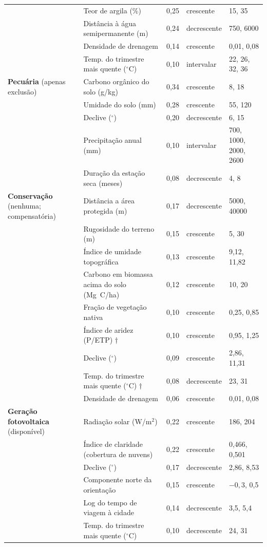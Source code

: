 \begin{longtable}{@{}p{2.6cm}p{3.6cm}p{1cm}p{1.7cm}p{3.3cm}@{}}
 & Teor de argila (\%) & 0,25 & crescente & 15, 35 \\
 & Distância à água semipermanente (m) & 0,24 & decrescente & 750, 6000 \\
 & Densidade de drenagem & 0,14 & crescente & 0,01, 0,08 \\
 & Temp. do trimestre mais quente ($^\circ$C) & 0,10 & intervalar & 22, 26, 32, 36 \\
\textbf{Pecuária} (apenas exclusão) & Carbono orgânico do solo (g/kg) & 0,34 & crescente & 8, 18 \\
 & Umidade do solo (mm) & 0,28 & crescente & 55, 120 \\
 & Declive ($^\circ$) & 0,20 & decrescente & 6, 15 \\
 & Precipitação anual (mm) & 0,10 & intervalar & 700, 1000, 2000, 2600 \\
 & Duração da estação seca (meses) & 0,08 & decrescente & 4, 8 \\
\textbf{Conservação} (nenhuma; compensatória) & Distância a área protegida (m) & 0,17 & decrescente &
  5000, 40000 \\
 & Rugosidade do terreno (m) & 0,15 & crescente & 5, 30 \\
 & Índice de umidade topográfica & 0,13 & crescente & 9,12, 11,82 \\
 & Carbono em biomassa acima do solo (Mg~C/ha) & 0,12 & crescente & 10, 20 \\
 & Fração de vegetação nativa & 0,10 & crescente & 0,25, 0,85 \\
 & Índice de aridez (P/ETP) $\dagger$ & 0,10 & crescente & 0,95, 1,25 \\
 & Declive ($^\circ$) & 0,09 & crescente & 2,86, 11,31 \\
 & Temp. do trimestre mais quente ($^\circ$C) $\dagger$ & 0,08 & decrescente & 23, 31 \\
 & Densidade de drenagem & 0,06 & crescente & 0,01, 0,08 \\
\textbf{Geração fotovoltaica} (disponível) & Radiação solar (W/m$^2$) & 0,22 & crescente & 186, 204 \\
 & Índice de claridade (cobertura de nuvens) & 0,22 & crescente & 0,466, 0,501 \\
 & Declive ($^\circ$) & 0,17 & decrescente & 2,86, 8,53 \\
 & Componente norte da orientação & 0,15 & crescente & $-0{,}3$, 0,5 \\
 & Log do tempo de viagem à cidade & 0,14 & decrescente & 3,5, 5,4 \\
 & Temp. do trimestre mais quente ($^\circ$C) & 0,10 & decrescente & 24, 31 \\
\bottomrule
\end{longtable}

